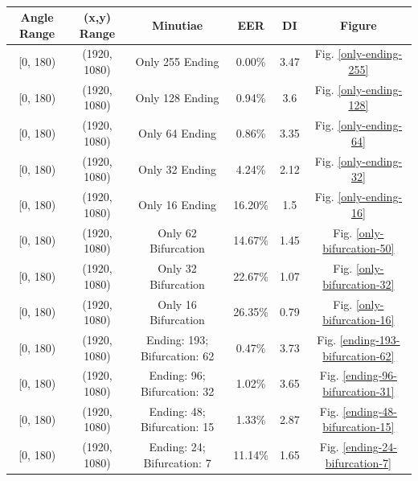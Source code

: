 \begin{table}[h!]
    \centering
    \caption{}
    \begin{tabular}{cccccc}
    \hline
    Angle Range & (x,y) Range  & Minutiae                     & EER     & DI   & Figure \\ \hline
    {[}0, 180)  & (1920, 1080) & Only 255 Ending              & 0.00\%  & 3.47 & Fig. \ref{only-ending-255}  \\
    {[}0, 180)  & (1920, 1080) & Only 128 Ending              & 0.94\%  & 3.6  & Fig. \ref{only-ending-128}  \\
    {[}0, 180)  & (1920, 1080) & Only 64 Ending               & 0.86\%  & 3.35 & Fig. \ref{only-ending-64}  \\
    {[}0, 180)  & (1920, 1080) & Only 32 Ending               & 4.24\%  & 2.12 & Fig. \ref{only-ending-32}  \\
    {[}0, 180)  & (1920, 1080) & Only 16 Ending               & 16.20\% & 1.5  & Fig. \ref{only-ending-16}  \\
    {[}0, 180)  & (1920, 1080) & Only 62 Bifurcation          & 14.67\% & 1.45 & Fig. \ref{only-bifurcation-50}  \\
    {[}0, 180)  & (1920, 1080) & Only 32 Bifurcation          & 22.67\% & 1.07 & Fig. \ref{only-bifurcation-32}  \\
    {[}0, 180)  & (1920, 1080) & Only 16 Bifurcation          & 26.35\% & 0.79 & Fig. \ref{only-bifurcation-16}  \\
    {[}0, 180)  & (1920, 1080) & Ending: 193; Bifurcation: 62 & 0.47\%  & 3.73 & Fig. \ref{ending-193-bifurcation-62}  \\
    {[}0, 180)  & (1920, 1080) & Ending: 96; Bifurcation: 32  & 1.02\%  & 3.65 & Fig. \ref{ending-96-bifurcation-31} \\
    {[}0, 180)  & (1920, 1080) & Ending: 48; Bifurcation: 15  & 1.33\%  & 2.87 & Fig. \ref{ending-48-bifurcation-15} \\
    {[}0, 180)  & (1920, 1080) & Ending: 24; Bifurcation: 7   & 11.14\% & 1.65 & Fig. \ref{ending-24-bifurcation-7} \\ \hline
    \end{tabular}
    \label{original-text-table}
\end{table}

